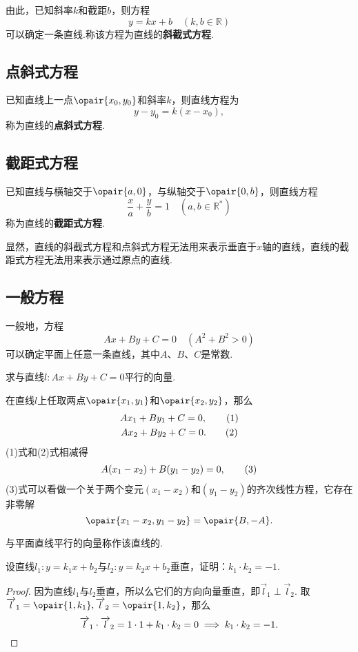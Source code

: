 由此，已知斜率\(k\)和截距\(b\)，则方程\[
y = k x + b \quad(k,b \in \mathbb{R})
\]可以确定一条直线.称该方程为直线的\textbf{斜截式方程}.

\subsection{点斜式方程}
已知直线上一点\(\opair{x_0,y_0}\)和斜率\(k\)，则直线方程为\[
y-y_0 = k(x-x_0),
\]称为直线的\textbf{点斜式方程}.

\subsection{截距式方程}
已知直线与横轴交于\(\opair{a,0}\)，与纵轴交于\(\opair{0,b}\)，则直线方程\[
\frac{x}{a}+\frac{y}{b}=1 \quad(a,b\in\mathbb{R}^*)
\]称为直线的\textbf{截距式方程}.

显然，直线的斜截式方程和点斜式方程无法用来表示垂直于\(x\)轴的直线，直线的截距式方程无法用来表示通过原点的直线.

\subsection{一般方程}
一般地，方程\[
A x + B y + C = 0 \quad(A^2+B^2>0)
\]可以确定平面上任意一条直线，其中\(A\)、\(B\)、\(C\)是常数.

\begin{example}
求与直线\(l: A x + B y + C = 0\)平行的向量.
\begin{solution}
在直线\(l\)上任取两点\(\opair{x_1,y_1}\)和\(\opair{x_2,y_2}\)，那么\begin{gather}
A x_1 + B y_1 + C = 0, \tag1 \\
A x_2 + B y_2 + C = 0. \tag2
\end{gather}
(1)式和(2)式相减得\begin{gather}
A (x_1-x_2) + B (y_1-y_2) = 0, \tag3
\end{gather}
(3)式可以看做一个关于两个变元\((x_1-x_2)\)和\((y_1-y_2)\)的齐次线性方程，它存在非零解\[
\opair{x_1-x_2,y_1-y_2} = \opair{B,-A}.
\]
\end{solution}
\end{example}
与平面直线平行的向量称作该直线的.

\begin{example}
设直线\(l_1: y=k_1 x+b_2\)与\(l_2: y=k_2 x+b_2\)垂直，证明：\(k_1 \cdot k_2 = -1\).
\begin{proof}
因为直线\(l_1\)与\(l_2\)垂直，所以么它们的方向向量垂直，即\(\vec{l}_1 \perp \vec{l}_2\).
取\(\vec{l}_1 = \opair{1,k_1},\vec{l}_2 = \opair{1,k_2}\)，那么\[
\vec{l}_1\cdot\vec{l}_2 = 1 \cdot 1 + k_1 \cdot k_2 = 0
\implies
k_1 \cdot k_2 = -1.
\qedhere
\]
\end{proof}
\end{example}

